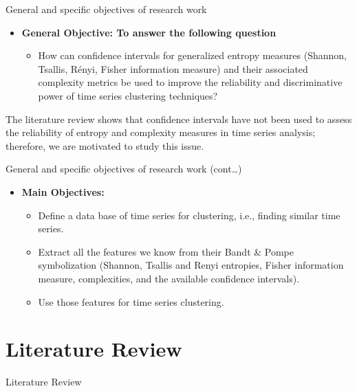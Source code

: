 \documentclass{beamer}
\begin{document}
\begin{frame}{General and specific objectives of research work}
	\begin{itemize}
		\item \textbf{General Objective: To answer the following question}
		\begin{itemize}
			\item How can confidence intervals for generalized entropy measures (Shannon, Tsallis, Rényi, Fisher information measure) and their associated complexity metrics be used to improve the 
			reliability and discriminative power of time series clustering techniques?
		\end{itemize}
	\end{itemize}		
		
The literature review shows that confidence intervals have not been used to assess the reliability of entropy and complexity measures in time series analysis; therefore, we are motivated to study this issue.
\end{frame}

\begin{frame}{General and specific objectives of research work (cont\dots)}
\begin{itemize}
	\item \textbf{Main Objectives:}
	\begin{itemize}
		\item Define a data base of time series for clustering, i.e., finding similar time series. 
		\item Extract all the features we know from their Bandt \& Pompe symbolization (Shannon, Tsallis and Renyi entropies, Fisher information measure, complexities, and the available confidence intervals).
		\item Use those features for time series clustering.
	\end{itemize} 
\end{itemize}	

\end{frame}


\section{Literature Review}
\begin{frame}
	\begin{center}
		\alert{Literature Review}
	\end{center}
\end{frame}
\end{document}
